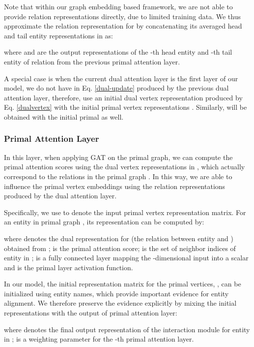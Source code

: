 \documentclass{article}
\begin{document}
Note that within our graph embedding based framework, we are not able to provide relation representations directly, due to limited training data. We thus approximate the relation representation for  by concatenating its averaged head and tail entity representations in  as:

where 
 and  are the output representations
of the -th head entity and -th tail entity of relation  from the previous primal attention layer.

A special case is when the current dual attention layer is the first layer of our model, we do not have  in Eq. \ref{dual-update} produced by the previous dual attention layer, therefore, use an initial dual vertex representation produced by Eq. \ref{dualvertex} with the initial primal vertex representations . Similarly,  will be obtained with the initial primal  as well. 

\subsubsection{Primal Attention Layer}
In this layer, when applying GAT on the primal graph, we can compute the primal attention scores using the dual vertex representations in , which actually correspond to the relations in the primal graph . In this way, we are able to influence the primal vertex embeddings using the relation representations produced by the dual attention layer. 

Specifically, we use  to denote the input primal vertex representation matrix. For an entity  in primal graph , its representation  can be computed by:



where  denotes the dual representation for  (the relation between entity  and ) obtained from ; 
 is the primal attention score; 
 is the set of neighbor indices of entity  in ; 
 is a fully connected layer mapping the -dimensional input into a scalar and  is the primal layer activation function.

In our model, the initial representation matrix for the primal vertices, , can be initialized using entity names, which provide important evidence for entity alignment. We therefore preserve the evidence explicitly by mixing the initial representations with the output of primal attention layer:
\vspace{-1mm}

where  denotes the final output representation of the interaction module for entity  in ;  is a weighting parameter for the -th primal attention layer.
\end{document}
